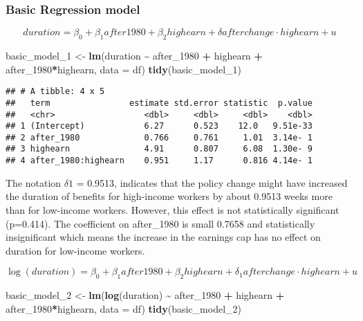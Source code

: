 \documentclass[
]{article}
\newenvironment{Shaded}{\begin{snugshade}}{\end{snugshade}}
\newcommand{\AttributeTok}[1]{\textcolor[rgb]{0.13,0.29,0.53}{#1}}
\newcommand{\FunctionTok}[1]{\textcolor[rgb]{0.13,0.29,0.53}{\textbf{#1}}}
\newcommand{\NormalTok}[1]{#1}
\newcommand{\OtherTok}[1]{\textcolor[rgb]{0.56,0.35,0.01}{#1}}
\newcommand{\SpecialCharTok}[1]{\textcolor[rgb]{0.81,0.36,0.00}{\textbf{#1}}}
\begin{document}
\subsubsection{Basic Regression model}\label{basic-regression-model}

\[
duration = \beta_0 + \beta_1 after1980 + \beta_2 highearn + \delta afterchange \cdot highearn + u
\]

\begin{Shaded}
\begin{Highlighting}[]
\NormalTok{basic\_model\_1 }\OtherTok{\textless{}{-}} \FunctionTok{lm}\NormalTok{(duration }\SpecialCharTok{\textasciitilde{}}\NormalTok{ after\_1980 }\SpecialCharTok{+}\NormalTok{ highearn }\SpecialCharTok{+}\NormalTok{ after\_1980}\SpecialCharTok{*}\NormalTok{highearn, }\AttributeTok{data =}\NormalTok{ df)}
\FunctionTok{tidy}\NormalTok{(basic\_model\_1)}
\end{Highlighting}
\end{Shaded}

\begin{verbatim}
## # A tibble: 4 x 5
##   term                estimate std.error statistic  p.value
##   <chr>                  <dbl>     <dbl>     <dbl>    <dbl>
## 1 (Intercept)            6.27      0.523    12.0   9.51e-33
## 2 after_1980             0.766     0.761     1.01  3.14e- 1
## 3 highearn               4.91      0.807     6.08  1.30e- 9
## 4 after_1980:highearn    0.951     1.17      0.816 4.14e- 1
\end{verbatim}

The notation \(\delta\)\(1\) = 0.9513, indicates that the policy change
might have increased the duration of benefits for high-income workers by
about 0.9513 weeks more than for low-income workers. However, this
effect is not statistically significant (p=0.414). The coefficient on
after\_1980 is small 0.7658 and statistically insignificant which means
the increase in the earnings cap has no effect on duration for
low-income workers.

\[
\log(duration) = \beta_0 + \beta_1 after1980 + \beta_2 highearn + \delta_1 afterchange \cdot highearn + u
\]

\begin{Shaded}
\begin{Highlighting}[]
\NormalTok{basic\_model\_2 }\OtherTok{\textless{}{-}} \FunctionTok{lm}\NormalTok{(}\FunctionTok{log}\NormalTok{(duration) }\SpecialCharTok{\textasciitilde{}}\NormalTok{ after\_1980 }\SpecialCharTok{+}\NormalTok{ highearn }\SpecialCharTok{+}\NormalTok{ after\_1980}\SpecialCharTok{*}\NormalTok{highearn, }\AttributeTok{data =}\NormalTok{ df)}
\FunctionTok{tidy}\NormalTok{(basic\_model\_2)}
\end{Highlighting}
\end{Shaded}
\end{document}

